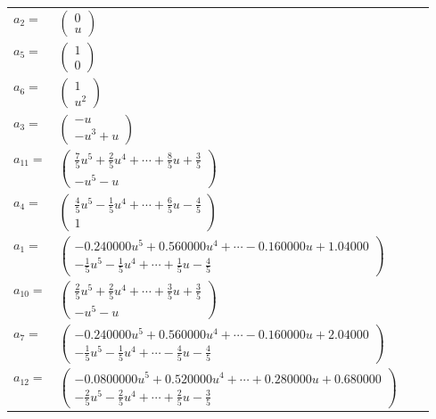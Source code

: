 \documentclass[1p]{elsarticle_modified}
\theoremstyle{definition}
\begin{document}
\begin{tabular}{m{7pt} m{180pt} m{7pt} m{180pt} }
\flushright $a_{2}=$&$\begin{pmatrix}0\\u\end{pmatrix}$ \\
\flushright $a_{5}=$&$\begin{pmatrix}1\\0\end{pmatrix}$ \\
\flushright $a_{6}=$&$\begin{pmatrix}1\\u^2\end{pmatrix}$ \\
\flushright $a_{3}=$&$\begin{pmatrix}- u\\- u^3+u\end{pmatrix}$ \\
\flushright $a_{11}=$&$\begin{pmatrix}\frac{7}{5} u^5+\frac{2}{5} u^4+\cdots+\frac{8}{5} u+\frac{3}{5}\\- u^5- u\end{pmatrix}$ \\
\flushright $a_{4}=$&$\begin{pmatrix}\frac{4}{5} u^5-\frac{1}{5} u^4+\cdots+\frac{6}{5} u-\frac{4}{5}\\1\end{pmatrix}$ \\
\flushright $a_{1}=$&$\begin{pmatrix}-0.240000 u^{5}+0.560000 u^{4}+\cdots-0.160000 u+1.04000\\-\frac{1}{5} u^5-\frac{1}{5} u^4+\cdots+\frac{1}{5} u-\frac{4}{5}\end{pmatrix}$ \\
\flushright $a_{10}=$&$\begin{pmatrix}\frac{2}{5} u^5+\frac{2}{5} u^4+\cdots+\frac{3}{5} u+\frac{3}{5}\\- u^5- u\end{pmatrix}$ \\
\flushright $a_{7}=$&$\begin{pmatrix}-0.240000 u^{5}+0.560000 u^{4}+\cdots-0.160000 u+2.04000\\-\frac{1}{5} u^5-\frac{1}{5} u^4+\cdots-\frac{4}{5} u-\frac{4}{5}\end{pmatrix}$ \\
\flushright $a_{12}=$&$\begin{pmatrix}-0.0800000 u^{5}+0.520000 u^{4}+\cdots+0.280000 u+0.680000\\-\frac{2}{5} u^5-\frac{2}{5} u^4+\cdots+\frac{2}{5} u-\frac{3}{5}\end{pmatrix}$ \\

\end{tabular}
\end{document}
